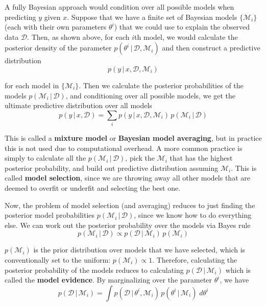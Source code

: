 \documentclass{article}
\begin{document}
    A fully Bayesian approach would condition over all possible models when predicting $y$ given $x$. Suppose that we have a finite set of Bayesian models $\{\mathcal{M}_i\}$ (each with their own parameters $\theta^i$) that we could use to explain the observed data $\mathcal{D}$. Then, as shown above, for each $i$th model, we would calculate the posterior density of the parameter $p(\theta^i\,|\,\mathcal{D}, \mathcal{M}_i)$ and then construct a predictive distribution
    \begin{equation}
      p(y\,|\,x, \mathcal{D}, \mathcal{M}_i)
    \end{equation}

    for each model in $\{\mathcal{M}_i\}$. Then we calculate the posterior probabilities of the models $p(\mathcal{M}_i\,|\,\mathcal{D})$, and conditioning over all possible models, we get the ultimate predictive distribution over all models
    \begin{equation}
      p(y\,|\,x, \mathcal{D}) = \sum_i p(y\,|\,x, \mathcal{D}, \mathcal{M}_i)\, p(\mathcal{M}_i\,|\,\mathcal{D})
    \end{equation}

    This is called a \textbf{mixture model} or \textbf{Bayesian model averaging}, but in practice this is not used due to computational overhead. A more common practice is simply to calculate all the $p(\mathcal{M}_i\,|\,\mathcal{D})$, pick the $\mathcal{M}_i$ that has the highest posterior probability, and build out predictive distribution assuming $\mathcal{M}_i$. This is called \textbf{model selection}, since we are throwing away all other models that are deemed to overfit or underfit and selecting the best one.

    Now, the problem of model selection (and averaging) reduces to just finding the posterior model probabilities $p(\mathcal{M}_i \,|\,\mathcal{D})$, since we know how to do everything else. We can work out the posterior probability over the models via Bayes rule
    \begin{equation}
      p(\mathcal{M}_i \,|\,\mathcal{D}) \propto p(\mathcal{D}\,|\,\mathcal{M}_i)\, p(\mathcal{M}_i)
    \end{equation}

    $p(\mathcal{M}_i)$ is the prior distribution over models that we have selected, which is conventionally set to the uniform: $p(\mathcal{M}_i) \propto 1$. Therefore, calculating the posterior probability of the models reduces to calculating $p(\mathcal{D}\,|\,\mathcal{M}_i)$ which is called the \textbf{model evidence}. By marginalizing over the parameter $\theta^i$, we have
    \begin{equation}
      p(\mathcal{D}\,|\,\mathcal{M}_i) = \int p(\mathcal{D}\,|\,\theta^i, \mathcal{M}_i) \, p(\theta^i\,|\,\mathcal{M}_i)\; d\theta^i
    \end{equation}
\end{document}
